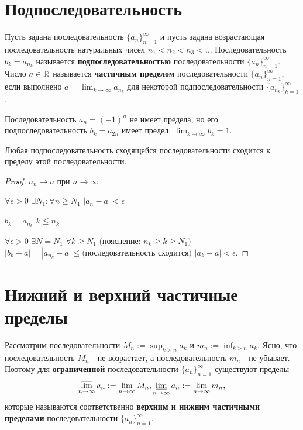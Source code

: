 	\section{Подпоследовательность}
	
	\begin{theorem}
		Пусть задана последовательность $\{a_n\}^{\infty}_{n = 1}$ и пусть задана
		возрастающая последовательность натуральных чисел $n_1 < n_2 < n_3 < ...$ Последовательность $b_k = a_{n_k}$ называется \textbf{подпоследовательностью} последовательности $\{a_n\}^{\infty}_{n = 1}$. Число $a \in \mathbb R$ называется \textbf{частичным пределом} последовательности $\{a_n\}^{\infty}_{n = 1}$, если выполнено $a = \lim_{k \to \infty} a_{n_k}$ для некоторой подпоследовательности $\{a_{n_k}\}^{\infty}_{k = 1}$.
	\end{theorem}
	
	\begin{mention}
		Последовательность $a_n = (-1)^n$ не имеет предела, но его подпоследовательность $b_k = a_{2n}$ имеет предел: $\lim_{k \to \infty} b_k = 1$.
	\end{mention}
	
	\begin{sentence}
		Любая подпоследовательность сходящейся последовательности сходится к пределу этой последовательности.
	\end{sentence}
	
	\begin{proof}
		$a_n \to a$ при $n \to \infty$
		
		$\forall \epsilon > 0$ $\exists N_1: \forall n \geqslant N_1$ $|a_n - a| < \epsilon$
		
		$b_k = a_{n_k}$ $k \leqslant n_k$
		
		$\forall \epsilon > 0$ $\exists N = N_1$ $\forall k \geqslant N_1 \text{ (пояснение: } n_k \geqslant k \geqslant N_1)$ $|b_k - a| = |a_{n_k} - a| \leqslant \text{(последовательность сходится) } |a_k - a| < \epsilon.$
	\end{proof}
	
	\section{Нижний и верхний частичные пределы}
	
	\begin{definition}
		Рассмотрим последовательности $M_n := \sup_{k > n} a_k$ и $m_n := \inf_{k > n} a_k$. Ясно, что последовательность $M_n$ - не возрастает, а
		последовательность $m_n$ - не убывает. Поэтому для \textbf{ограниченной} последовательности $\{a_n\}^{\infty}_{n = 1}$ существуют пределы
		\[ \operatorname*{\overline{lim}}_{n \to \infty} a_n := \lim_{n \to \infty} M_n, \operatorname*{\underline{lim}}_{n \to \infty}	a_n := \lim_{n \to \infty} m_n, \]
		которые называются соответственно \textbf{верхним и нижним частичными пределами} последовательности $\{a_n\}^{\infty}_{n = 1}$.
	\end{definition}
	
